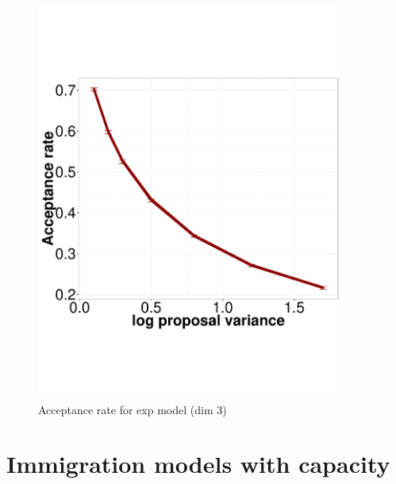   \begin{figure}%
  \centering
  \begin{minipage}[hp]{0.45\linewidth}
  \centering
    \includegraphics [width=0.90\textwidth, angle=0]{figs/acc_rate_exp_d3.pdf}
      \end{minipage}
    \caption{Acceptance rate for exp model (dim 3)}
	\label{fig:acc_exp}
  \end{figure}


\section{Immigration models with capacity}~


